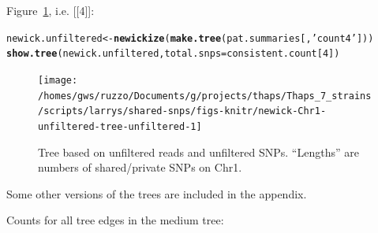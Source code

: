 \documentclass{article}\usepackage[]{graphicx}\usepackage[]{color}
\makeatletter
\newcommand{\hlnum}[1]{\textcolor[rgb]{0.686,0.059,0.569}{#1}}%
\newcommand{\hlstr}[1]{\textcolor[rgb]{0.192,0.494,0.8}{#1}}%
\newcommand{\hlstd}[1]{\textcolor[rgb]{0.345,0.345,0.345}{#1}}%
\newcommand{\hlkwb}[1]{\textcolor[rgb]{0.69,0.353,0.396}{#1}}%
\newcommand{\hlkwc}[1]{\textcolor[rgb]{0.333,0.667,0.333}{#1}}%
\newcommand{\hlkwd}[1]{\textcolor[rgb]{0.737,0.353,0.396}{\textbf{#1}}}%
\newenvironment{kframe}{%
 \def\at@end@of@kframe{}%
 \ifinner\ifhmode%
  \def\at@end@of@kframe{\end{minipage}}%
  \begin{minipage}{\columnwidth}%
 \fi\fi%
 \def\FrameCommand##1{\hskip\@totalleftmargin \hskip-\fboxsep
 \colorbox{shadecolor}{##1}\hskip-\fboxsep
     \hskip-\linewidth \hskip-\@totalleftmargin \hskip\columnwidth}%
 \MakeFramed {\advance\hsize-\width
   \@totalleftmargin\z@ \linewidth\hsize
   \@setminipage}}%
 {\par\unskip\endMakeFramed%
 \at@end@of@kframe}
\newenvironment{knitrout}{}{} %
\makeatother
\begin{document}
Figure~\ref{fig:tree-unfiltered}, i.e. [[4]]:

\begin{knitrout}\scriptsize
{}\color{fgcolor}\begin{kframe}
\begin{alltt}
\hlstd{newick.unfiltered} \hlkwb{<-} \hlkwd{newickize}\hlstd{(}\hlkwd{make.tree}\hlstd{(pat.summaries[,}\hlstr{'count4'}\hlstd{]))}
\hlkwd{show.tree}\hlstd{(newick.unfiltered,} \hlkwc{total.snps}\hlstd{=consistent.count[}\hlnum{4}\hlstd{])}
\end{alltt}
\end{kframe}\begin{figure}

{\centering \texttt{[image: /homes/gws/ruzzo/Documents/g/projects/thaps/Thaps\_7\_strains/scripts/larrys/shared-snps/figs-knitr/newick-Chr1-unfiltered-tree-unfiltered-1]} 

}

\caption[Tree based on unfiltered reads and unfiltered SNPs]{Tree based on unfiltered reads and unfiltered SNPs.  ``Lengths'' are numbers of shared/private SNPs on Chr1.}\label{fig:tree-unfiltered}
\end{figure}


\end{knitrout}

Some other versions of the trees are included in the appendix.

Counts for all tree edges in the medium tree: 
\end{document}
